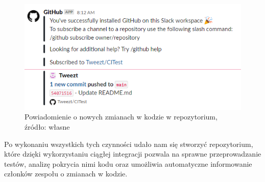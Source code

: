 \begin{figure}[htbp]
    \centering
    \includegraphics[width=12cm]{images/testingCI9.png}
    \caption{Powiadomienie o nowych zmianach w kodzie w repozytorium, źródło: własne}
    \label{fig:ci9}
\end{figure}

Po wykonaniu wszystkich tych czynności udało nam się stworzyć repozytorium, które dzięki wykorzystaniu ciągłej integracji pozwala na sprawne przeprowadzanie testów, analizę pokrycia nimi kodu oraz umożliwia automatyczne informowanie członków zespołu o zmianach w kodzie. 

